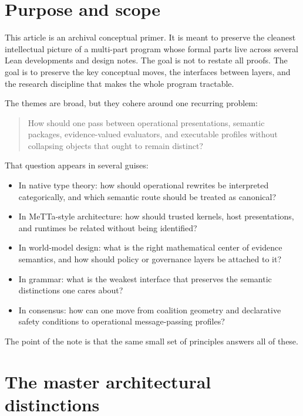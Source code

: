 \documentclass[11pt]{article}
\begin{document}
\tableofcontents

\section{Purpose and scope}

This article is an archival conceptual primer. It is meant to preserve the cleanest intellectual picture of a multi-part program whose formal parts live across several Lean developments and design notes. The goal is not to restate all proofs. The goal is to preserve the key conceptual moves, the interfaces between layers, and the research discipline that makes the whole program tractable.

The themes are broad, but they cohere around one recurring problem:

\begin{quote}
How should one pass between operational presentations, semantic packages, evidence-valued evaluators, and executable profiles without collapsing objects that ought to remain distinct?
\end{quote}

That question appears in several guises:

\begin{itemize}
  \item In native type theory: how should operational rewrites be interpreted categorically, and which semantic route should be treated as canonical?
  \item In MeTTa-style architecture: how should trusted kernels, host presentations, and runtimes be related without being identified?
  \item In world-model design: what is the right mathematical center of evidence semantics, and how should policy or governance layers be attached to it?
  \item In grammar: what is the weakest interface that preserves the semantic distinctions one cares about?
  \item In consensus: how can one move from coalition geometry and declarative safety conditions to operational message-passing profiles?
\end{itemize}

The point of the note is that the same small set of principles answers all of these.

\section{The master architectural distinctions}
\end{document}
